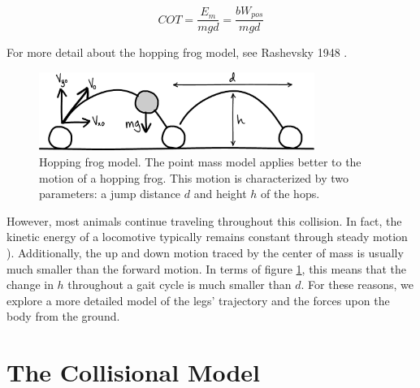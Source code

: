 \begin{equation}
COT = \frac{E_{m}}{mgd} = \frac{bW_{pos}}{mgd}
\end{equation}

For more detail about the hopping frog model, see Rashevsky 1948 \cite{rashevsky48}.

\begin{figure}[h]		%
\begin{centering}
\includegraphics[width=0.8\textwidth]{Figures/HoppingFrogModel}\par
\end{centering}
\caption[Diagram: Hopping Frog Model]{Hopping frog model. The point mass model applies better to the motion of a hopping frog. This motion is characterized by two parameters: a jump distance $d$ and height $h$ of the hops.}
\label{fig:HoppingFrogModel}
\end{figure}
%

However, most animals continue traveling throughout this collision. In fact, the kinetic energy of a locomotive typically remains constant through steady motion \cite{ruina05}). Additionally, the up and down motion traced by the center of mass is usually much smaller than the forward motion. In terms of figure \ref{fig:HoppingFrogModel}, this means that the change in $h$ throughout a gait cycle is much smaller than $d$. For these reasons, we explore a more detailed model of the legs' trajectory and the forces upon the body from the ground.

\section{The Collisional Model} %
\label{sec:TheCollisionalModel}


